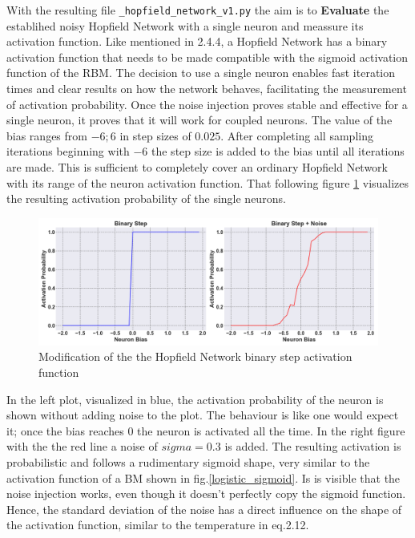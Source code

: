 With the resulting file \texttt{\_hopfield\_network\_v1.py} the aim is to \textbf{Evaluate} the establihed noisy Hopfield Network with a single neuron 
and meassure its activation function.
Like mentioned in 2.4.4, a Hopfield Network has a binary activation function that needs to be made compatible with the sigmoid activation function of the \ac{RBM}.
The decision to use a single neuron enables fast iteration times and clear results on how the network behaves, facilitating the measurement of activation probability.
Once the noise injection proves stable and effective for a single neuron, it proves that it will work for coupled neurons.
The value of the bias ranges from \(-6; 6\) in step sizes of \(0.025\). After completing all sampling iterations beginning with \(-6\) the step size is added to the bias until all iterations are made.
This is sufficient to completely cover an ordinary Hopfield Network with its range of the neuron activation function. 
That following figure \ref{Noisy_acitivation_function_bad} visualizes the resulting activation probability of the single neurons. 
\begin{figure}[H]
    \centering
    \includegraphics[width=1\linewidth]{graphics/combined_noise_activation_plots.png}
    \caption{Modification of the the Hopfield Network binary step activation function}
    \label{Noisy_acitivation_function_bad}
\end{figure}
In the left plot, visualized in blue, the activation probability of the neuron is shown without adding noise to the plot. 
The behaviour is like one would expect it; once the bias reaches 0 the neuron is activated all the time.
In the right figure with the the red line a noise of \(sigma=0.3\) is added.
The resulting activation is probabilistic and follows a rudimentary sigmoid shape, very similar to the activation function of a \ac{BM} shown in fig.\ref{logistic_sigmoid}.
Is is visible that the noise injection works, even though it doesn't perfectly copy the sigmoid function.
Hence, the standard deviation of the noise has a direct influence on the shape of the activation function, similar to the temperature in eq.2.12. 
